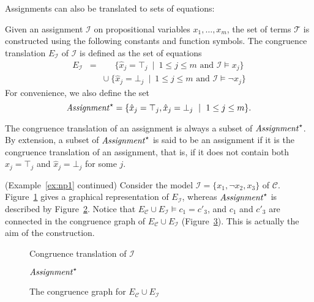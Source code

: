 \documentclass[smallextended]{svjour3}
\begin{document}
Assignments can also be translated to sets of equations:
\begin{definition}
Given an assignment $\mathcal{I}$ on propositional variables $x_1,\ldots,x_m$, the set of terms $\mathcal{T}$ is constructed using the following constants and function symbols.
The congruence translation $E_{\mathcal{I}}$ of $\mathcal{I}$ is defined as the set of equations
\begin{eqnarray*}
  E_{\mathcal{I}} & = & \phantom{\cup}\ \{ \hat{x}_j = \top_j \ \mid\  1 \leq j \leq m \text{ and } \mathcal{I} \models x_j \} \\
               &   & \cup\ \{ \hat{x}_j = \bot_j \ \mid\ 1 \leq j \leq m \text{ and } \mathcal{I} \models \neg x_j \}
\end{eqnarray*}
For convenience, we also define the set
\begin{equation*}
  {\it Assignment}^\star = \{ \hat{x}_j = \top_j, \hat{x}_j = \bot_j \ \mid\ 1 \leq j \leq m\}.
\end{equation*}
\end{definition}
\noindent
The congruence translation of an assignment is always a subset of
${\it Assignment}^\star$.  By extension, a subset of ${\it Assignment}^\star$ is
said to be an assignment if it is the congruence translation of an assignment,
that is, if it does not contain both $\hat{x}_j = \top_j$ and $\hat{x}_j =
\bot_j$ for some $j$.

\begin{example}\label{ex:np2} (Example~\ref{ex:np1} continued)  
Consider the model $\mathcal{I} = \{x_1, \neg x_2, x_3\}$ of\/ $\mathcal{C}$.
Figure~\ref{fig:npassignment} gives a graphical representation of
$E_{\mathcal{I}}$, whereas ${\it Assignment}^\star$ is described by
Figure~\ref{fig:npassignmentstar}.  Notice that
$E_{\mathcal{C}} \cup E_{\mathcal{I}} \models c_1 = c'_3$,
and $c_1$ and $c'_3$ are connected in the congruence graph
of $E_{\mathcal{C}} \cup E_{\mathcal{I}}$ (Figure~\ref{fig:npmodel}).
This is actually the aim of the construction.

\begin{figure}[ht]

\caption{Congruence translation of $\mathcal{I}$}
\label{fig:npassignment}
\end{figure}

\begin{figure}[ht]

\caption{${\it Assignment}^\star$}
\label{fig:npassignmentstar}
\end{figure}
\begin{figure}[ht]

\caption{The congruence graph for $E_{\mathcal{C}} \cup E_{\mathcal{I}}$}
\label{fig:npmodel}
\end{figure}
\end{example}
\end{document}

